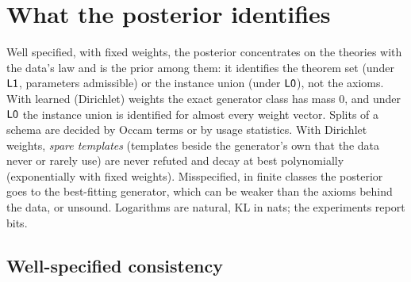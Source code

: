 
\section{What the posterior identifies}\label{sec:ident}

Well specified, with fixed weights, the posterior concentrates on the theories with the data's law and is the prior among them: it identifies the theorem set (under $\mathord{\mathsf{L1}}$, parameters admissible) or the instance union (under $\mathord{\mathsf{L0}}$), not the axioms. With learned (Dirichlet) weights the exact generator class has mass $0$, and under $\mathord{\mathsf{L0}}$ the instance union is identified for almost every weight vector. Splits of a schema are decided by Occam terms or by usage statistics. With Dirichlet weights, \emph{spare templates} (templates beside the generator's own that the data never or rarely use) are never refuted and decay at best polynomially (exponentially with fixed weights). Misspecified, in finite classes the posterior goes to the best-fitting generator, which can be weaker than the axioms behind the data, or unsound. Logarithms are natural, KL in nats; the experiments report bits.

\subsection{Well-specified consistency}\label{sec:ident:wellspec}

